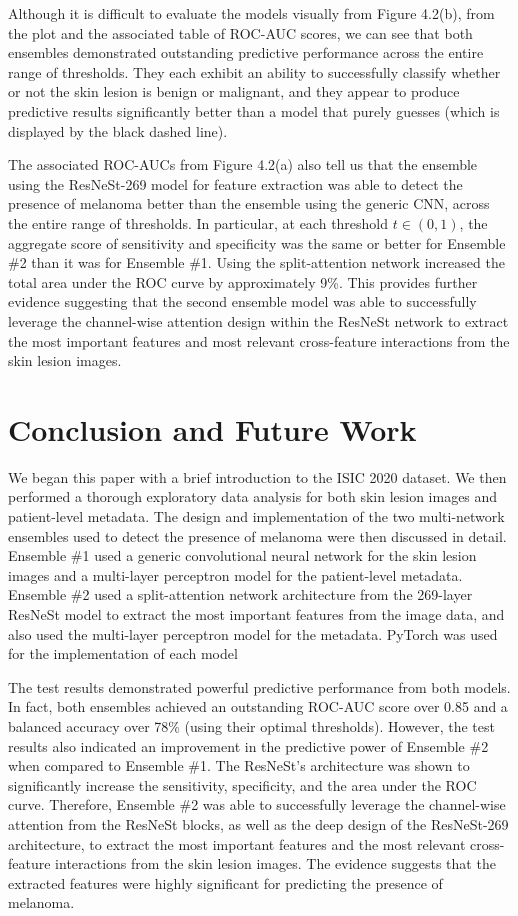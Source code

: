 \documentclass [MAS] {uclathes}
\begin{document}
Although it is difficult to evaluate the models visually from Figure 4.2(b), from the plot and the associated table of ROC-AUC scores, we can see that both ensembles demonstrated outstanding predictive performance across the entire range of thresholds. They each exhibit an ability to successfully classify whether or not the skin lesion is benign or malignant, and they appear to produce predictive results significantly better than a model that purely guesses (which is displayed by the black dashed line).

The associated ROC-AUCs from Figure 4.2(a) also tell us that the ensemble using the ResNeSt-269 model for feature extraction was able to detect the presence of melanoma better than the ensemble using the generic CNN, across the entire range of thresholds. In particular, at each threshold $t \in (0, 1)$, the aggregate score of sensitivity and specificity was the same or better for Ensemble \#2 than it was for Ensemble \#1. Using the split-attention network increased the total area under the ROC curve by approximately 9\%. This provides further evidence suggesting that the second ensemble model was able to successfully leverage the channel-wise attention design within the ResNeSt network to extract the most important features and most relevant cross-feature interactions from the skin lesion images.

\chapter{Conclusion and Future Work}

We began this paper with a brief introduction to the ISIC 2020 dataset. We then performed a thorough exploratory data analysis for both skin lesion images and patient-level metadata. The design and implementation of the two multi-network ensembles used to detect the presence of melanoma were then discussed in detail. Ensemble \#1 used a generic convolutional neural network for the skin lesion images and a multi-layer perceptron model for the patient-level metadata. Ensemble \#2 used a split-attention network architecture from the 269-layer ResNeSt model to extract the most important features from the image data, and also used the multi-layer perceptron model for the metadata. PyTorch was used for the implementation of each model \cite{NEURIPS2019_9015}

The test results demonstrated powerful predictive performance from both models. In fact, both ensembles achieved an outstanding ROC-AUC score over 0.85 and a balanced accuracy over 78\% (using their optimal thresholds). However, the test results also indicated an improvement in the predictive power of Ensemble \#2 when compared to Ensemble \#1. The ResNeSt's architecture was shown to significantly increase the sensitivity, specificity, and the area under the ROC curve. Therefore, Ensemble \#2 was able to successfully leverage the channel-wise attention from the ResNeSt blocks, as well as the deep design of the ResNeSt-269 architecture, to extract the most important features and the most relevant cross-feature interactions from the skin lesion images. The evidence suggests that the extracted features were highly significant for predicting the presence of melanoma.
\end{document}
